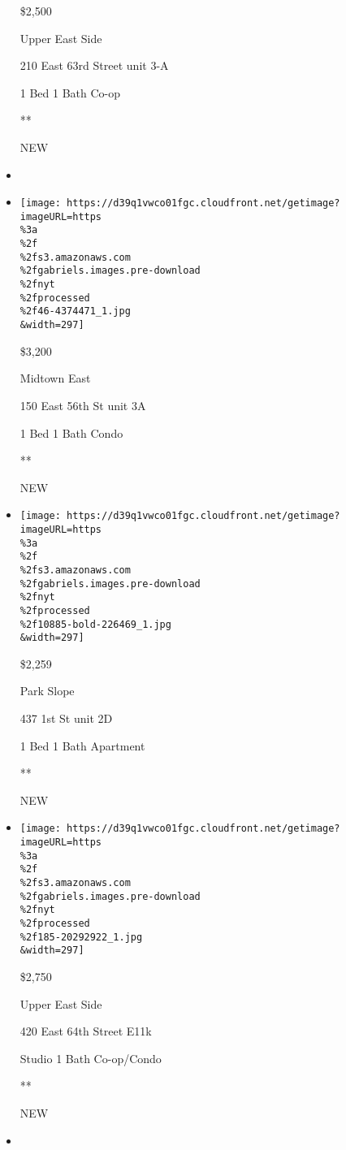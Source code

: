 \begin{itemize}
  \$2,500

  Upper East Side

  210 East 63rd Street unit 3-A

  1 Bed \textbar{} 1 Bath \textbar{} Co-op

  **

  NEW
\item
\item
  \href{/real-estate/usa/ny/new-york/midtown-east/homes-for-rent/150-east-56th-st/46-4374471?}{}

  \texttt{[image: https://d39q1vwco01fgc.cloudfront.net/getimage?imageURL=https\\\%3a\\\%2f\\\%2fs3.amazonaws.com\\\%2fgabriels.images.pre-download\\\%2fnyt\\\%2fprocessed\\\%2f46-4374471\_1.jpg\\\&width=297]}

  \$3,200

  Midtown East

  150 East 56th St unit 3A

  1 Bed \textbar{} 1 Bath \textbar{} Condo

  **

  NEW
\item
  \href{/real-estate/usa/ny/brooklyn/park-slope/homes-for-rent/437--1st-st/10885-BOLD-226469?}{}

  \texttt{[image: https://d39q1vwco01fgc.cloudfront.net/getimage?imageURL=https\\\%3a\\\%2f\\\%2fs3.amazonaws.com\\\%2fgabriels.images.pre-download\\\%2fnyt\\\%2fprocessed\\\%2f10885-bold-226469\_1.jpg\\\&width=297]}

  \$2,259

  Park Slope

  437 1st St unit 2D

  1 Bed \textbar{} 1 Bath \textbar{} Apartment

  **

  NEW
\item
  \href{/real-estate/usa/ny/new-york/upper-east-side/homes-for-rent/420-east-64th-street-e11k/185-20292922?}{}

  \texttt{[image: https://d39q1vwco01fgc.cloudfront.net/getimage?imageURL=https\\\%3a\\\%2f\\\%2fs3.amazonaws.com\\\%2fgabriels.images.pre-download\\\%2fnyt\\\%2fprocessed\\\%2f185-20292922\_1.jpg\\\&width=297]}

  \$2,750

  Upper East Side

  420 East 64th Street E11k

  Studio \textbar{} 1 Bath \textbar{} Co-op/Condo

  **

  NEW
\item
  \href{/real-estate/usa/ny/new-york/upper-east-side/homes-for-rent/417-east-65-street/343-RLMX-001030011639325?}{}


\end{itemize}
